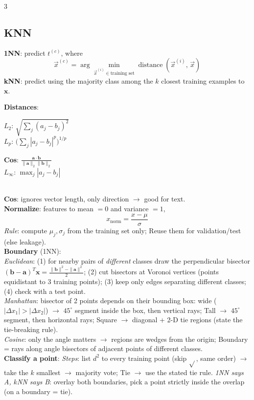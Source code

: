 \documentclass[10pt]{article}
\newcommand{\vx}{\mathbf{x}}
\newcommand{\sub}[1]{\textit{#1}:}  %
\begin{document}
\begin{multicols*}{3}
\subsection{KNN}
\textbf{1NN}: predict $t^{(c)}$, where
\[ \vec{x}^{(c)} = \arg\min_{\vec{x}^{(i)}\in\text{training set}} \operatorname{distance}\left(\vec{x}^{(i)},\, \vec{x}\right) \]
\textbf{kNN}: predict using the majority class among the $k$ closest training examples to $\vx$.\\
{\fontsize{4}{4.7}\selectfont \textbf{Distances}:\\
\begin{minipage}[t]{0.5\linewidth}
\textbf{$L_2$}: $\sqrt{\sum_j (a_j-b_j)^2}$\\[1pt]
\textbf{$L_p$}: $\big(\sum_j |a_j-b_j|^p\big)^{1/p}$
\end{minipage}\vrule\hspace{2pt}
\begin{minipage}[t]{0.47\linewidth}
\textbf{Cos}: $\frac{\mathbf a\cdot\mathbf b}{\|\mathbf a\|_2\|\mathbf b\|_2}$\\[1pt]
\textbf{$L_\infty$}: $\max_j |a_j-b_j|$
\end{minipage}}\\
\textbf{Cos}: ignores vector length, only direction $\to$ good for text.\\
\textbf{Normalize}: features to mean $=0$ and variance $=1$,
\[ x_{\text{norm}} = \frac{x-\mu}{\sigma} \]
\sub{Rule} compute $\mu_j,\sigma_j$ from the training set only; Reuse them for validation/test (else leakage).\\
\textbf{Boundary} (1NN):\\
\sub{Euclidean} (1) for nearby pairs of \emph{different} classes draw the perpendicular bisector $(\mathbf b-\mathbf a)^T\vx=\frac{\|\mathbf b\|^2-\|\mathbf a\|^2}{2}$; (2) cut bisectors at Voronoi vertices (points equidistant to 3 training points); (3) keep only edges separating different classes; (4) check with a test point.\\
\sub{Manhattan} bisector of 2 points depends on their bounding box: wide ($|\Delta x_1|>|\Delta x_2|$) $\to$ $45^\circ$ segment inside the box, then vertical rays; Tall $\to$ $45^\circ$ segment, then horizontal rays; Square $\to$ diagonal + 2-D tie regions (state the tie-breaking rule).\\
\sub{Cosine} only the angle matters $\to$ regions are wedges from the origin; Boundary = rays along angle bisectors of adjacent points of different classes.\\
\textbf{Classify a point}: \sub{Steps} list $d^2$ to every training point (skip $\sqrt{}$, same order) $\to$ take the $k$ smallest $\to$ majority vote; Tie $\to$ use the stated tie rule. \sub{1NN says A, $k$NN says B} overlay both boundaries, pick a point strictly inside the overlap (on a boundary = tie).\\

\end{multicols*}
\end{document}
